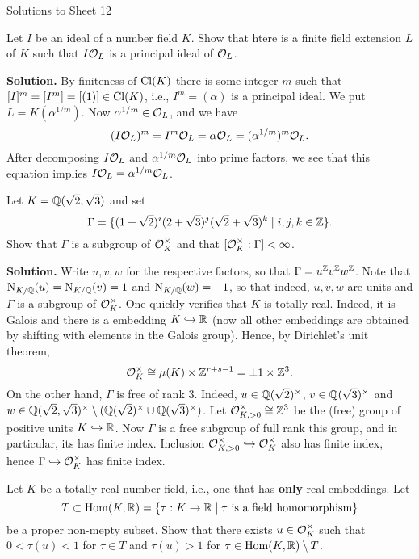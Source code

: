 \documentclass[a4paper,11pt]{article}
\begin{document}
\begin{center}
    \huge{Solutions to Sheet 12}
\end{center}

Let $I$ be an ideal of a number field $K$. Show that htere is a finite field extension $L$ of $K$ such that 
$I \mathcal{O}_L$ is a principal ideal of $\mathcal{O}_L$.

\textbf{Solution.}
By finiteness of $\operatorname{Cl}(K)$ there is some integer $m$ such that $[I]^m = [I^m] = [(1)] \in \operatorname{Cl}(K)$,
i.e., $I^m = (\alpha)$ is a principal ideal. We put $L = K(\alpha^{1/m})$. Now 
$\alpha^{1/m} \in \mathcal{O}_L$, and we have 
$$(I \mathcal{O}_L)^m = I^m \mathcal{O}_L = \alpha \mathcal{O}_L = (\alpha^{1/m})^m \mathcal{O}_L.$$
After decomposing $I\mathcal{O}_L$ and $\alpha^{1/m}\mathcal{O}_L$ into prime factors, we see that 
this equation implies $I\mathcal{O}_L = \alpha^{1/m} \mathcal{O}_L$. 

Let $K = \mathbb{Q}(\sqrt 2, \sqrt 3)$ and set 
\begin{equation*}
    \Gamma = \{(1+ \sqrt 2)^i(2 + \sqrt 3)^j(\sqrt 2 + \sqrt 3)^k \mid i,j,k \in \mathbb{Z}\}.
\end{equation*}
Show that $\Gamma$ is a subgroup of $\mathcal{O}_K^\times$ and that $[\mathcal{O}_K^\times: \Gamma] < \infty$.

\textbf{Solution.}
Write $u,v,w$ for the respective factors, so that $\Gamma = u^{\mathbb{Z}} v^{\mathbb{Z}} w^{\mathbb{Z}}$. 
Note that $\operatorname{N}_{K/\mathbb{Q}}(u) = \operatorname{N}_{K/\mathbb{Q}}(v) = 1$ and $\operatorname{N}_{K/\mathbb{Q}}(w) = -1$, so that indeed,
$u,v,w$ are units and $\Gamma$ is a subgroup of $\mathcal{O}_K^\times$. One quickly verifies that
$K$ is totally real. Indeed, it is Galois and there is a embedding $K \hookrightarrow \mathbb{R}$ (now all
other embeddings are obtained by shifting with elements in the Galois group). 
Hence, by Dirichlet's unit theorem, 
$$\mathcal{O}_K^\times \cong \mu(K) \times \mathbb{Z}^{r+s-1} = \pm 1 \times \mathbb{Z}^3.$$
On the other hand, $\Gamma$ is free of rank $3$. Indeed, $u \in \mathbb{Q}(\sqrt 2)^\times$,
$v \in \mathbb{Q}(\sqrt 3)^\times$ and $w \in \mathbb{Q}(\sqrt 2, \sqrt
3)^\times\setminus(\mathbb{Q}(\sqrt 2)^\times \cup \mathbb{Q}(\sqrt 3)^\times)$. 
Let $\mathcal{O}_{K, >0}^\times \cong \mathbb{Z}^3$ be the (free) group of positive units $K \hookrightarrow \mathbb{R}$. 
Now $\Gamma$ is a free subgroup of full rank this group, and in particular, 
its has finite index. Inclusion $\mathcal{O}_{K, >0}^\times \hookrightarrow \mathcal{O}_K^\times$ also has
finite index, hence $\Gamma \hookrightarrow \mathcal{O}_K^\times$ has finite index. 

Let $K$ be a totally real number field, i.e., one that has \textbf{only} real embeddings.
Let 
\begin{equation*}
    T \subset \operatorname{Hom}(K, \mathbb{R}) = \{\tau: K \to \mathbb{R} \mid \tau \text { is a field homomorphism}\}
\end{equation*}
be a proper non-mepty subset. Show that there exists $u \in \mathcal{O}_K^\times$ such that 
$0 < \tau(u) < 1$ for $\tau \in T$ and $\tau(u) > 1$ for $\tau \in \operatorname{Hom}(K, \mathbb{R})
\setminus T$.
\end{document}
